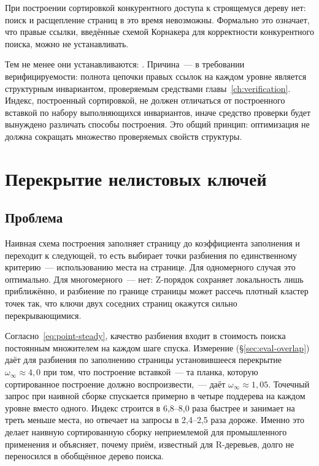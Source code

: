 При построении сортировкой конкурентного доступа к строящемуся дереву нет:
поиск и расщепление страниц в это время невозможны. Формально это означает, что
правые ссылки, введённые схемой Корнакера \cite{kornacker1997concurrency} для
корректности конкурентного поиска, можно не устанавливать.

Тем не менее они устанавливаются: . Причина~--- в требовании верифицируемости: полнота
цепочки правых ссылок на каждом уровне является структурным инвариантом,
проверяемым средствами главы~\ref{ch:verification}. Индекс, построенный
сортировкой, не должен отличаться от построенного вставкой по набору
выполняющихся инвариантов, иначе средство проверки будет вынуждено различать
способы построения. Это общий принцип: оптимизация не должна сокращать
множество проверяемых свойств структуры.

\section{Перекрытие нелистовых ключей}
\label{sec:overlap-fix}

\subsection{Проблема}

Наивная схема построения заполняет страницу до коэффициента заполнения и
переходит к следующей, то есть выбирает точки разбиения по единственному
критерию~--- использованию места на странице. Для одномерного случая это
оптимально. Для многомерного~--- нет: Z-порядок сохраняет локальность лишь
приближённо, и разбиение по границе страницы может рассечь плотный кластер
точек так, что ключи двух соседних страниц окажутся сильно перекрывающимися.

Согласно~\eqref{eq:point-steady}, качество разбиения входит в стоимость поиска
постоянным множителем на каждом шаге спуска. Измерение
(§\ref{sec:eval-overlap}) даёт для разбиения по заполнению страницы
установившееся перекрытие $\omega_\infty \approx 4{,}0$ при том, что построение
вставкой~--- та планка, которую сортированное построение должно
воспроизвести,~--- даёт $\omega_\infty \approx 1{,}05$. Точечный запрос при
наивной сборке спускается примерно в четыре поддерева на каждом уровне вместо
одного. Индекс строится в 6,8--8,0 раза быстрее и занимает на треть меньше
места, но отвечает на запросы в 2,4--2,5 раза дороже. Именно это делает наивную
сортированную сборку неприемлемой для промышленного применения и объясняет,
почему приём, известный для R-деревьев, долго не переносился в обобщённое
дерево поиска.

